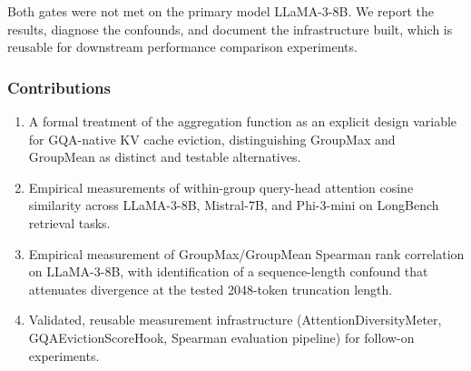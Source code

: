 Both gates were not met on the primary model LLaMA-3-8B. We report the results, diagnose the confounds, and document the infrastructure built, which is reusable for downstream performance comparison experiments.

\subsubsection{Contributions}

\begin{enumerate}
\item A formal treatment of the aggregation function as an explicit design variable for GQA-native KV cache eviction, distinguishing GroupMax and GroupMean as distinct and testable alternatives.
\item Empirical measurements of within-group query-head attention cosine similarity across LLaMA-3-8B, Mistral-7B, and Phi-3-mini on LongBench retrieval tasks.
\item Empirical measurement of GroupMax/GroupMean Spearman rank correlation on LLaMA-3-8B, with identification of a sequence-length confound that attenuates divergence at the tested 2048-token truncation length.
\item Validated, reusable measurement infrastructure (AttentionDiversityMeter, GQAEvictionScoreHook, Spearman evaluation pipeline) for follow-on experiments.
\end{enumerate}

